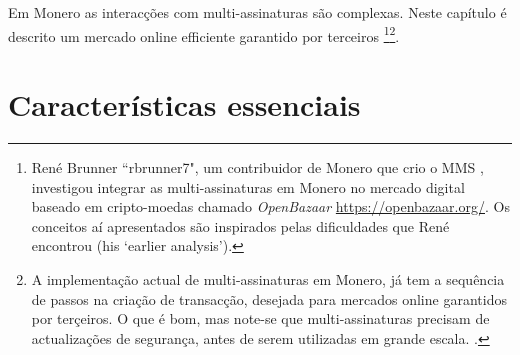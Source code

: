 Em Monero as interacções com multi-assinaturas são complexas.  
Neste capítulo é descrito um mercado online efficiente garantido por terceiros \footnote{René Brunner ``rbrunner7", um contribuidor de Monero que crio o MMS \cite{mms-project-proposal, mms-manual}, investigou integrar as multi-assinaturas em Monero no mercado digital baseado em cripto-moedas chamado {\em OpenBazaar} \url{https://openbazaar.org/}. Os conceitos aí apresentados são inspirados pelas dificuldades que René encontrou \cite{openbazaar-rbrunner-investigation} (his `earlier analysis').}\footnote{A implementação actual de multi-assinaturas em Monero, já tem a sequência de passos na criação de transacção, desejada para mercados online garantidos por terçeiros. O que é bom, mas note-se que multi-assinaturas precisam de actualizações de segurança, antes de serem utilizadas em grande escala. \cite{multisig-research-issue-67}.}. 

\section{Características essenciais}
\label{sec:escrowed-marketplace-essential-features}

